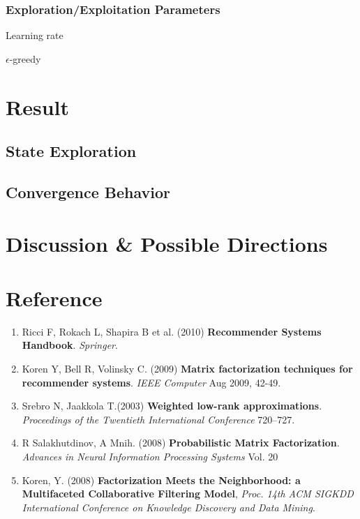\documentclass[11pt]{article}
\theoremstyle{definition}
\begin{document}
\subsubsection{Exploration/Exploitation Parameters}

Learning rate

$\epsilon$-greedy

\section{\textbf{Result}}

\subsection{\textbf{State Exploration}}

\subsection{\textbf{Convergence Behavior}}


\section{\textbf{Discussion \& Possible Directions}}


\newpage
\section*{\textbf{Reference}}
\begin{enumerate}
\item \label{ref:handbook}
Ricci F, Rokach L, Shapira B et al. (2010) \textbf{Recommender Systems Handbook}. \textit{Springer}. 
\item \label{ref:MFieee}
Koren Y, Bell R, Volinsky C. (2009) \textbf{Matrix factorization techniques for recommender systems}. \textit{IEEE Computer} Aug 2009, 42-49. 
\item \label{ref:WLA}
Srebro N,  Jaakkola T.(2003) \textbf{Weighted low-rank approximations}. \textit{Proceedings of the Twentieth International Conference} 720–727.
\item \label{ref:PMF}
R Salakhutdinov, A Mnih. (2008) \textbf{Probabilistic Matrix Factorization}. \textit{Advances in Neural Information Processing Systems} Vol. 20

\item \label{ref:implicit}
Koren, Y. (2008) \textbf{Factorization Meets the Neighborhood: a Multifaceted Collaborative Filtering Model}, \textit{Proc. 14th ACM SIGKDD International Conference on Knowledge Discovery and
Data Mining}.

\end{enumerate}
\end{document}
